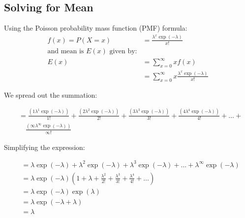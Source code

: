 \documentclass[a4paper]{article}
\begin{document}
\subsection{Solving for Mean}
\begin{center}
Using the Poisson probability mass function (PMF) formula:
\begin{align*}
f(x) = P(X = x) &= \frac{\lambda^x \exp(-\lambda)}{x!}\\
\text{and mean is } E(x) \text{ given by:}\\
E(x) &= \sum_{x=0}^{\infty} xf(x) \\
&= \sum_{x=0}^{\infty} x \frac{\lambda^x \exp(-\lambda)}{x!}
\end{align*}

We spread out the summation:

\begin{align*}
&= \frac{(1\lambda^1 \exp(-\lambda))}{1!} + \frac{(2\lambda^2 \exp(-\lambda))}{2!} + \frac{(3\lambda^3 \exp(-\lambda))}{3!} + \frac{(4\lambda^4 \exp(-\lambda))}{4!} + \dots + \\
&\quad \frac{(\infty\lambda^\infty \exp(-\lambda))}{\infty!}
\end{align*}

Simplifying the expression:

\begin{align*}
&= \lambda \exp(-\lambda) + \lambda^2 \exp(-\lambda) + \lambda^3 \exp(-\lambda) + \dots + \lambda^\infty \exp(-\lambda) \\
&= \lambda \exp(-\lambda) (1 + \lambda + \frac{\lambda^2}{2!} + \frac{\lambda^3}{3!} + \frac{\lambda^4}{4!} + \dots) \\
&= \lambda \exp(-\lambda) \exp(\lambda) \\
&= \lambda \exp(-\lambda+\lambda)  \\
&= \lambda
\end{align*}

\end{center}
\end{document}

